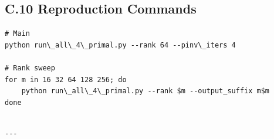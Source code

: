 \subsection{C.10 Reproduction Commands}

\begin{lstlisting}
# Main
python run\_all\_4\_primal.py --rank 64 --pinv\_iters 4

# Rank sweep
for m in 16 32 64 128 256; do
    python run\_all\_4\_primal.py --rank $m --output_suffix m$m
done
\end{lstlisting}
\begin{lstlisting}

---
\end{lstlisting}